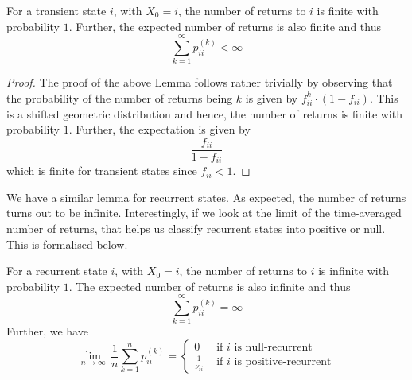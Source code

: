 \documentclass[12pt]{article}
\theoremstyle{definition}
\begin{document}
\begin{lem}
    For a transient state $i$, with $X_0 = i$, the number of returns to $i$ is finite with probability $1$. Further, the expected number of returns is also finite and thus
    \[
        \sum_{k=1}^{\infty} p_{ii}^{(k)} < \infty
    \]
\end{lem}

\begin{proof}
    The proof of the above Lemma follows rather trivially by observing that the probability of the number of returns being $k$ is given by $f_{ii}^{k} \cdot \left( 1 - f_{ii} \right)$. This is a shifted geometric distribution and hence, the number of returns is finite with probability $1$. Further, the expectation is given by
    \[
        \frac{f_{ii}}{1 - f_{ii}}
    \]
    which is finite for transient states since $f_{ii} < 1$. 
\end{proof}

We have a similar lemma for recurrent states. As expected, the number of returns turns out to be infinite. Interestingly, if we look at the limit of the time-averaged number of returns, that helps us classify recurrent states into positive or null. This is formalised below.

\newpage

\begin{lem}
    For a recurrent state $i$, with $X_0 = i$, the number of returns to $i$ is infinite with probability $1$. The expected number of returns is also infinite and thus
    \[
        \sum_{k=1}^{\infty} p_{ii}^{(k)} = \infty
    \]
    Further, we have
    \[
        \lim_{n \to \infty} \, \frac{1}{n} \sum_{k=1}^{n} p_{ii}^{(k)} = \begin{cases}
            0 & \text{ if $i$ is null-recurrent} \\
            \frac{1}{\nu_{ii}} & \text{ if $i$ is positive-recurrent}
        \end{cases}
    \]
\end{lem}
\end{document}
